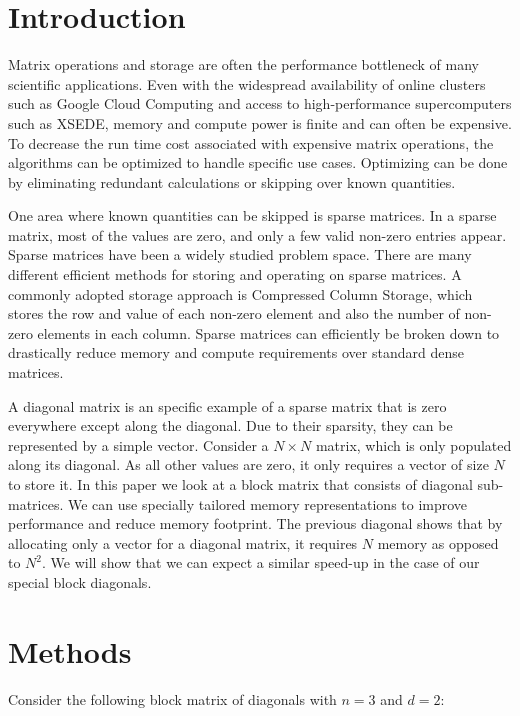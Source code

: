\documentclass[letterpaper, 10pt, twoside]{article}
\begin{document}
	\section{Introduction}
	Matrix operations and storage are often the performance bottleneck of many scientific applications. Even with the widespread availability of online clusters such as Google Cloud Computing and access to high-performance supercomputers such as XSEDE, memory and compute power is finite and can often be expensive. To decrease the run time cost associated with expensive matrix operations, the algorithms can be optimized to handle specific use cases. Optimizing can be done by eliminating redundant calculations or skipping over known quantities.
	
	One area where known quantities can be skipped is sparse matrices. In a sparse matrix, most of the values are zero, and only a few valid non-zero entries appear. Sparse matrices have been a widely studied problem space. There are many different efficient methods for storing and operating on sparse matrices. A commonly adopted storage approach is Compressed Column Storage, which stores the row and value of each non-zero element and also the number of non-zero elements in each column. Sparse matrices can efficiently be broken down to drastically reduce memory and compute requirements over standard dense matrices.
	
	A diagonal matrix is an specific example of a sparse matrix that is zero everywhere except along the diagonal. Due to their sparsity, they can be represented by a simple vector. Consider a $N\times N$ matrix, which is only populated along its diagonal. As all other values are zero, it only requires a vector of size $N$ to store it. In this paper we look at a block matrix that consists of diagonal sub-matrices. We can use specially tailored memory representations to improve performance and reduce memory footprint. The previous diagonal shows that by allocating only a vector for a diagonal matrix, it requires $N$ memory as opposed to $N^2$. We will show that we can expect a similar speed-up in the case of our special block diagonals.  
	 
	\section{Methods}
	Consider the following block matrix of diagonals with $n=3$ and $d=2$:
	
\end{document}
